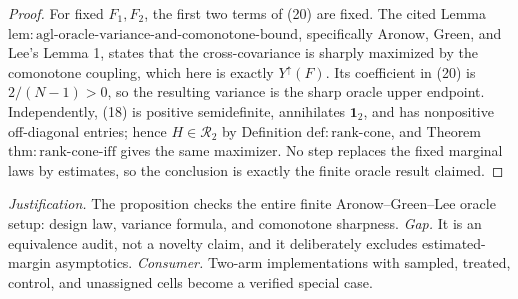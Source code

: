 \documentclass{article}
\begin{document}
\begin{proof}
For fixed \(F_1,F_2\), the first two terms of (20) are fixed.  The cited Lemma \(\mathrm{lem{:}agl\text{-}oracle\text{-}variance\text{-}and\text{-}comonotone\text{-}bound}\), specifically Aronow, Green, and Lee's Lemma 1, states that the cross-covariance is sharply maximized by the comonotone coupling, which here is exactly \(Y^{\uparrow}(F)\).  Its coefficient in (20) is \(2/(N-1)>0\), so the resulting variance is the sharp oracle upper endpoint.  Independently, (18) is positive semidefinite, annihilates \(\mathbf 1_2\), and has nonpositive off-diagonal entries; hence \(H\in\mathcal R_2\) by Definition \(\mathrm{def{:}rank\text{-}cone}\), and Theorem \(\mathrm{thm{:}rank\text{-}cone\text{-}iff}\) gives the same maximizer.  No step replaces the fixed marginal laws by estimates, so the conclusion is exactly the finite oracle result claimed.
\end{proof}
\par\smallskip\noindent \textit{Justification.} The proposition checks the entire finite Aronow--Green--Lee oracle setup: design law, variance formula, and comonotone sharpness. \textit{Gap.} It is an equivalence audit, not a novelty claim, and it deliberately excludes estimated-margin asymptotics. \textit{Consumer.} Two-arm implementations with sampled, treated, control, and unassigned cells become a verified special case.
\end{document}
